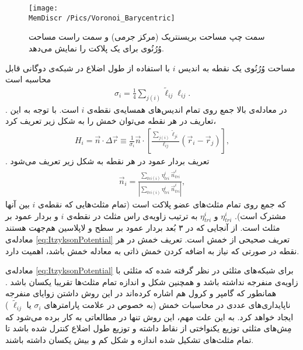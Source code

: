 \begin{figure}[htbp]
\begin{center}
\texttt{[image: \\MemDiscr /Pics/Voronoi\_Barycentric]}

\caption{
سمت چپ مساحت بریسنتریک (مرکز جرمی) و سمت راست مساحت وُرُنُوی برای یک پلاکت را نمایش می‌دهد.
}
\label{fig:voronoiBarycentric}
\end{center}
\end{figure}
مساحت وُرُنُوی
یک نقطه به اندیس 
$i$
با استفاده از طول اضلاع در شبکه‌ی دوگانی قابل محاسبه است
\begin{eqnarray}
\sigma_i=\frac{1}{4}\sum_{j(i)}\tilde\ell_{ij}\ell_{ij}.
\label{eq:voronoiArea}
\end{eqnarray}
. در معادله‌ی بالا جمع روی تمام اندیس‌های همسایه‌ی نقطه‌ی 
$i$
است. با توجه به این تعاریف در هر نقطه می‌توان خمش را به شکل زیر تعریف کرد،
\begin{eqnarray}
H_i=\vec n\cdot\Delta \vec r\equiv\frac{1}{\sigma_i}\vec n \cdot\left[\frac{\sum_{j(i)}\tilde\ell_{ji}}{\ell_{ij}}(\vec r_i-\vec r_j)\right],
\label{eq:meanCurvatureDiscreteSingleVertex}
\end{eqnarray}
. تعریف بردار عمود در هر نقطه به شکل زیر تعریف می‌شود
\cite{Thurrner1998NormalVec}
\begin{eqnarray}
\vec n_i=\frac{\sum_{tri(i)} \eta_{tri}^i~\vec n_{tri}^i}{|\sum_{tri(i)} \eta_{tri}^i~\vec n_{tri}^i|},
\label{eq:noramlVector}
\end{eqnarray}
که جمع روی تمام مثلث‌های عضو پلاکت
است (تمام مثلث‌هایی که نقطه‌ی 
$i$
بین آنها مشترک است). 
$\eta_{tri}^i$
و
$\eta_{tri}^i$
به ترتیب زاویه‌ی راس مثلث در نقطه‌ی 
$i$
و بردار عمود بر مثلث است. از آنجایی که در ۳ بُعد بردار عمود بر سطح و لاپلاسین هم‌جهت هستند
\cite{gompper1996}
معادله‌ی 
\ref{eq:ItzyksonPotential}
تعریف صحیحی از خمش است. تعریف خمش در هر نقطه در صورتی که نیاز به  اضافه کردن خمش ذاتی به معادله خمش باشد، اهمیت دارد. 

معادله‌ی
\ref{eq:ItzyksonPotential}
برای شبکه‌های مثلثی در نظر گرفته شده که مثلثی با زاویه‌ی منفرجه نداشته باشد و همچنین شکل و اندازه تمام مثلث‌ها تقریبا یکسان باشد
\cite{Itzykson1986}
. همانطور که گامپر و کرول هم اشاره کرده‌اند
\cite{gompper1996}
در این روش داشتن زوایای منفرجه ناپایداری‌های عددی در محاسبات خمش (به خصوص در علامت پارامتر‌های 
$\sigma_i$
یا
$\tilde\ell_{ij}$
) ایجاد خواهد کرد. به این علت مهم، این روش تنها  در مطالعاتی به کار برده می‌شود  که مِش‌های  مثلثی  توزیع یکنواختی از نقاط داشته و توزیع طول اضلاع کنترل شده باشد تا تمام مثلث‌های تشکیل شده اندازه و شکل کم و بیش یکسان داشته باشند.



